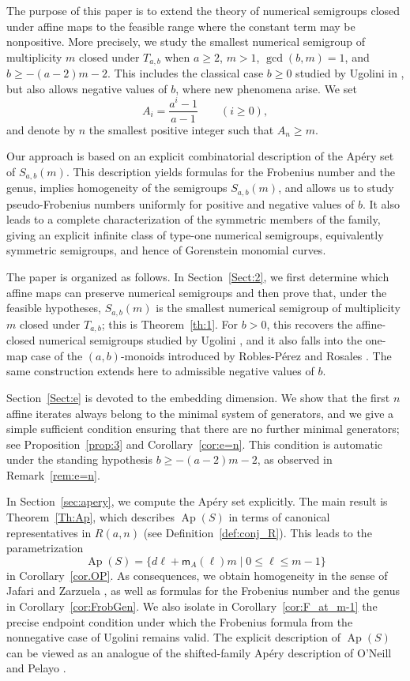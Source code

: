 \documentclass[12pt,a4paper]{amsart}
\theoremstyle{definition}
\begin{document}
The purpose of this paper is to extend the theory of numerical semigroups closed under affine maps to the feasible range where the constant term may be nonpositive. More precisely, we study the smallest numerical semigroup of multiplicity $m$ closed under $T_{a,b}$ when $a\ge 2$, $m>1$, $\gcd(b,m)=1$, and $b\ge -(a-2)m-2$. This includes the classical case $b\ge0$ studied by Ugolini in \cite{Ugo17}, but also allows negative values of $b$, where new phenomena arise. We set
\[
A_i=\frac{a^i-1}{a-1}\qquad(i\ge 0),
\]
and denote by $n$ the smallest positive integer such that $A_n\ge m$.

Our approach is based on an explicit combinatorial description of the Ap\'ery set of $S_{a,b}(m)$. This description yields formulas for the Frobenius number and the genus, implies homogeneity of the semigroups $S_{a,b}(m)$, and allows us to study pseudo-Frobenius numbers uniformly for positive and negative values of $b$. It also leads to a complete characterization of the symmetric members of the family, giving an explicit infinite class of type-one numerical semigroups, equivalently symmetric semigroups, and hence of Gorenstein monomial curves.

The paper is organized as follows. In Section~\ref{Sect:2}, we first determine which affine maps can preserve numerical semigroups and then prove that, under the feasible hypotheses, $S_{a,b}(m)$ is the smallest numerical semigroup of multiplicity $m$ closed under $T_{a,b}$; this is Theorem~\ref{th:1}. For $b>0$, this recovers the affine-closed numerical semigroups studied by Ugolini \cite{Ugo17}, and it also falls into the one-map case of the $(a,b)$-monoids introduced by Robles-P\'erez and Rosales \cite{RoblesRosales18}. The same construction extends here to admissible negative values of $b$.

Section~\ref{Sect:e} is devoted to the embedding dimension. We show that the first $n$ affine iterates always belong to the minimal system of generators, and we give a simple sufficient condition ensuring that there are no further minimal generators; see Proposition~\ref{prop:3} and Corollary~\ref{cor:e=n}. This condition is automatic under the standing hypothesis $b\ge -(a-2)m-2$, as observed in Remark~\ref{rem:e=n}.

In Section~\ref{sec:apery}, we compute the Ap\'ery set explicitly. The main result is Theorem~\ref{Th:Ap}, which describes $\operatorname{Ap}(S)$ in terms of canonical representatives in $R(a,n)$ (see Definition~\ref{def:conj_R}). This leads to the parametrization
\[
\operatorname{Ap}(S)=\{d\ell+\mathsf m_A(\ell)m\mid 0\le \ell\le m-1\}
\]
in Corollary~\ref{cor.OP}. As consequences, we obtain homogeneity in the sense of Jafari and Zarzuela \cite{JafariZarzuela18}, as well as formulas for the Frobenius number and the genus in Corollary~\ref{cor:FrobGen}. We also isolate in Corollary~\ref{cor:F_at_m-1} the precise endpoint condition under which the Frobenius formula from the nonnegative case of Ugolini \cite{Ugo17} remains valid. The explicit description of $\operatorname{Ap}(S)$ can be viewed as an analogue of the shifted-family Ap\'ery description of O'Neill and Pelayo \cite{ONeillPelayo18}.
\end{document}
